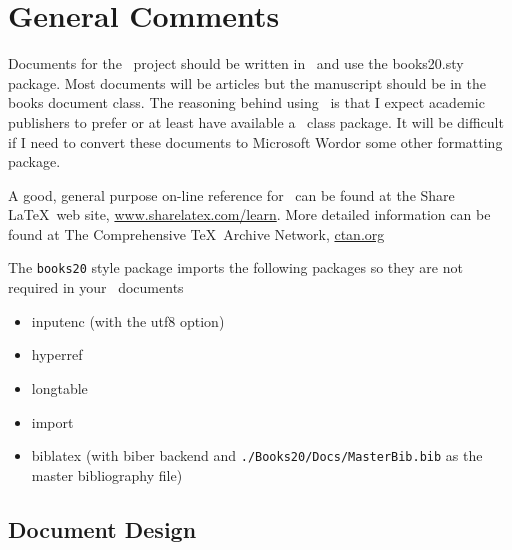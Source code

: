 
\section{General Comments}

Documents for the \ProjectTitle\ project should be written in \LaTeXe\ and use
the books20.sty package. Most documents will be articles but the
manuscript should be in the books document class. The reasoning behind
using \LaTeXe\ is that I expect academic publishers to prefer or at
least have available a \LaTeXe\ class package.  It will be difficult if
I need to convert these documents to Microsoft Word\texttrademark or
some other formatting package.

A good, general purpose on-line reference for \LaTeXe\ can be found at
the Share \LaTeX\ web site,
\href{http://www.sharelatex.com/learn}{www.sharelatex.com/learn}.
More detailed information can be found at The Comprehensive
\TeX\ Archive Network, \href{ctan.org}{ctan.org}

The \texttt{books20} style package imports the following packages so they are
not required in your \LaTeXe\ documents

\begin{itemize}
\item inputenc \cite{Jeffrey2018} (with the utf8 option)
\item hyperref \cite{Rahtz2017}
\item longtable \cite{Carlisle2014}
\item import \cite{Arseneau2009}
\item biblatex \cite{Lehman2018} (with biber backend and
  \texttt{./Books20/Docs/MasterBib.bib} as the master bibliography file)
\end{itemize}


\subsection{Document Design}

